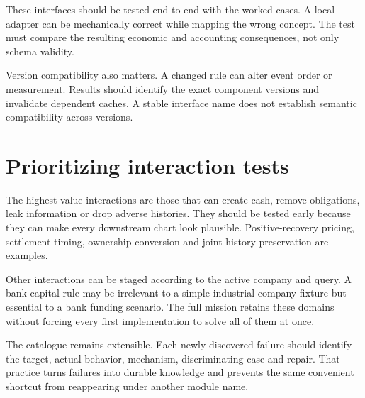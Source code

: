 These interfaces should be tested end to end with the worked cases. A local adapter can be mechanically correct while mapping the wrong concept. The test must compare the resulting economic and accounting consequences, not only schema validity.

Version compatibility also matters. A changed rule can alter event order or measurement. Results should identify the exact component versions and invalidate dependent caches. A stable interface name does not establish semantic compatibility across versions.



\section{Prioritizing interaction tests}
The highest-value interactions are those that can create cash, remove obligations, leak information or drop adverse histories. They should be tested early because they can make every downstream chart look plausible. Positive-recovery pricing, settlement timing, ownership conversion and joint-history preservation are examples.

Other interactions can be staged according to the active company and query. A bank capital rule may be irrelevant to a simple industrial-company fixture but essential to a bank funding scenario. The full mission retains these domains without forcing every first implementation to solve all of them at once.

The catalogue remains extensible. Each newly discovered failure should identify the target, actual behavior, mechanism, discriminating case and repair. That practice turns failures into durable knowledge and prevents the same convenient shortcut from reappearing under another module name.


